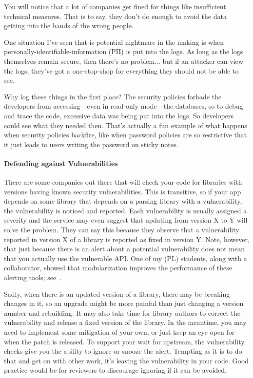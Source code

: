 You will notice that a lot of companies get fined for things like insufficient technical measures. That is to say, they don't do enough to avoid the data getting into the hands of the wrong people.

One situation I've seen that is potential nightmare in the making is when personally-identifiable-information (PII) is put into the logs. As long as the logs themselves remain secure, then there's no problem... but if an attacker can view the logs, they've got a one-stop-shop for everything they should not be able to see.

Why log these things in the first place?  The security policies forbade the developers from accessing---even in read-only mode---the databases, so to debug and trace the code, excessive data was being put into the logs. So developers could see what they needed then. That's actually a fun example of what happens when security policies backfire, like when password policies are so restrictive that it just leads to users writing the password on sticky notes.


\paragraph{Defending against Vulnerabilities}
There are some companies out there that will check your code for libraries with versions having known security vulnerabilities. This is transitive, so if your app depends on some library that depends on a parsing library with a vulnerability, the vulnerability is noticed and reported. Each vulnerability is usually assigned a severity and the service may even suggest that updating from version X to Y will solve the problem. They can say this because they observe that a vulnerability reported in version X of a library is reported as fixed in version Y. Note, however, that just because there is an alert about a potential vulnerability does not mean that you actually use the vulnerable API. One of my (PL) students, along with a collaborator, showed that modularization improves the performance of these alerting tools; see~\cite{abdollahpour24:_enhan_secur_modul}.

Sadly, when there is an updated version of a library, there may be breaking changes in it, so an upgrade might be more painful than just changing a version number and rebuilding. It may also take time for library authors to correct the vulnerability and release a fixed version of the library. In the meantime, you may need to implement some mitigation of your own, or just keep an eye open for when the patch is released. To support your wait for upstream, the vulnerability checks give you the ability to ignore or snooze the alert. Tempting as it is to do that and get on with other work, it's leaving the vulnerability in your code. Good practice would be for reviewers to discourage ignoring if it can be avoided.

